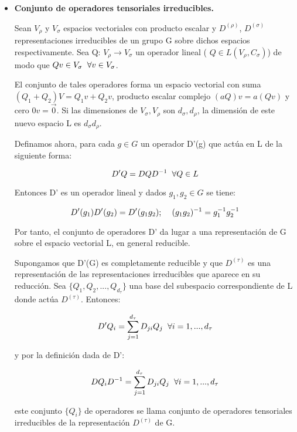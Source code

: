 \documentclass{article}
\begin{document}
       \begin{itemize}
           \item \textbf{Conjunto de operadores tensoriales irreducibles.}

           Sean $V_\rho$ y $V_\sigma$ espacios vectoriales con producto escalar y $D^{(\rho)}$, $D^{(\sigma)}$ representaciones irreducibles de un grupo G sobre dichos espacios respectivamente. Sea Q: $V_\rho \to V_\sigma$ un operador lineal ( $Q \in L(V_\rho ,C_\sigma)$) de modo que  $Qv\in V_\sigma \hspace{0.2cm} \forall v\in V_\sigma$.

           El conjunto de tales operadores forma un espacio vectorial con suma $(Q_1+Q_2)V=Q_1v+Q_2v$, producto escalar complejo $(aQ)v=a(Qv)$ y cero $0v=\Vec{0}$. Si las dimensiones de $V_\sigma, V_\rho$ son $d_\sigma, d_ \rho$, la dimensión de este nuevo espacio L es $d_ \sigma d_\rho$.

           Definamos ahora, para cada $g\in G$ un operador D'(g) que actúa en L de la siguiente forma:

           $$D'Q=DQD^{-1} \hspace{0.2cm}\forall Q\in L$$

           Entonces D' es un operador lineal y dados $g_1, g_2 \in G$ se tiene:

           $$D'(g_1)D'(g_2)=D'(g_1g_2); \hspace{0.4cm} (g_1g_2)^{-1}=g_1^{-1}g_2^{-1}$$

           Por tanto, el conjunto de operadores D' da lugar a una representación de G sobre el espacio vectorial L, en general reducible.

           Supongamos que D'(G) es completamente reducible y que $D^{(\tau)}$ es una representación de las representaciones irreducibles que aparece en su reducción. Sea $\lbrace Q_1,Q_2,...,Q_{d_\tau}\rbrace$ una base del subespacio correspondiente de L donde actúa $D^{(\tau)}$. Entonces:

           $$D'Q_i=\sum _{j=1}^{d_\tau} D_{ji}Q_j \hspace{0.2cm} \forall i=1,..., d_\tau$$

           y por la definición dada de D':

           $$DQ_iD^{-1}=\sum _{j=1}^{d_\tau} D_{ji}Q_j \hspace{0.2cm} \forall i=1,..., d_\tau$$

           este conjunto $\lbrace Q_i\rbrace$ de operadores se llama conjunto de operadores tensoriales irreducibles de la representación $D^{(\tau)}$ de G.
       \end{itemize}
\end{document}
